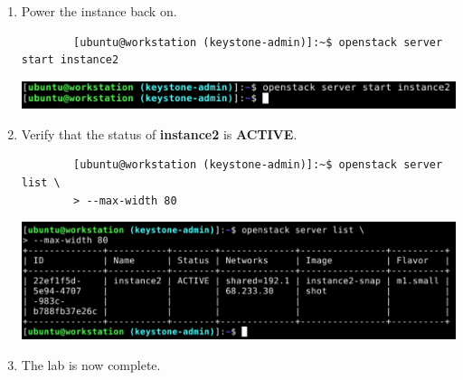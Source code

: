 \documentclass[letterpaper, 12pt]{article}
\begin{document}
\begin{enumerate}
    \item Power the instance back on.
    \begin{lstlisting}
        [ubuntu@workstation (keystone-admin)]:~$ openstack server start instance2
    \end{lstlisting}

    \begin{center}
        \includegraphics[width=\linewidth]{images/part4/step19.png}
    \end{center}

    \item Verify that the status of \textbf{instance2} is \textbf{ACTIVE}.
    \begin{lstlisting}
        [ubuntu@workstation (keystone-admin)]:~$ openstack server list \
        > --max-width 80
    \end{lstlisting}

    \begin{center}
        \includegraphics[width=\linewidth]{images/part4/step20.png}
    \end{center}

    \item The lab is now complete.

\end{enumerate}
\end{document}
